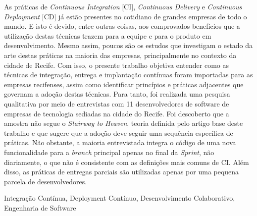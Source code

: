 \resumo

As práticas de \emph{Continuous Integration} [CI], \emph{Continuous Delivery} e \emph{Continuous Deployment} [CD] já estão presentes no cotidiano de grandes empresas de todo o mundo. E isto é devido, entre outras coisas, aos comprovados benefícios que a utilização destas técnicas trazem para a equipe e para o produto em desenvolvimento. Mesmo assim, poucos são os estudos que investigam o estado da arte destas práticas na maioria das empresas, principalmente no contexto da cidade de Recife.  Com isso, o presente trabalho objetiva entender como as técnicas de integração, entrega e implantação contínuas foram importadas para as empresas recifenses, assim como identificar princípios e práticas adjacentes que governam a adoção destas técnicas. Para tanto, foi realizada uma pesquisa qualitativa por meio de entrevistas com 11 desenvolvedores de software de empresas de tecnologia sediadas na cidade do Recife. Foi descoberto que a amostra não segue o \emph{Stairway to Heaven}, teoria definida pelo artigo base deste trabalho e que sugere que a adoção deve seguir uma sequência específica de práticas. Não obstante, a maioria entrevistada integra o código de uma nova funcionalidade para a \emph{branch} principal apenas no final da \emph{Sprint}, não diariamente, o que não é consistente com as definições mais comuns de CI. Além disso, as práticas de entregas parciais são utilizadas apenas por uma pequena parcela de desenvolvedores.

\begin{keywords}
    Integração Contínua, Deployment Contínuo, Desenvolvimento Colaborativo, Engenharia de Software
\end{keywords}
